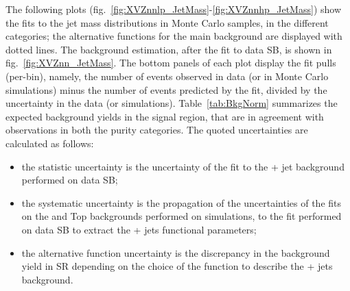 \noindent The following plots (fig.~\ref{fig:XVZnnlp_JetMass}-\ref{fig:XVZnnhp_JetMass}) show the fits to the jet mass distributions in Monte Carlo samples, in the different categories; the alternative functions for the main background are displayed with dotted lines. The background estimation, after the fit to data SB, is shown in fig.~\ref{fig:XVZnn_JetMass}. The bottom panels of each plot display the fit pulls (per-bin), namely, the number of events observed in data (or in Monte Carlo simulations) minus the number of events predicted by the fit, divided by the uncertainty in the data (or simulations). Table~\ref{tab:BkgNorm} summarizes the expected background yields in the signal region, that are in agreement with observations in both the purity categories. The quoted uncertainties are calculated as follows:
\begin{itemize}
\item the statistic uncertainty is the uncertainty of the fit to the \V + jet background performed on data SB;
\item the systematic uncertainty is the propagation of the uncertainties of the fits on the \VV and Top backgrounds performed on simulations, to the fit performed on data SB to extract the \V + jets functional parameters;
\item the alternative function uncertainty is the discrepancy in the background yield in SR depending on the choice of the function to describe the \V + jets background.
\end{itemize}







